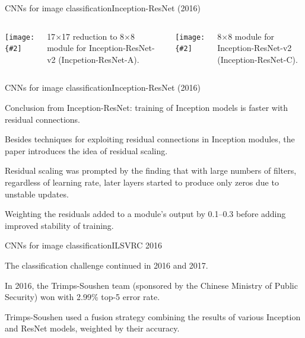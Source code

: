 \documentclass{beamer}
\newcommand{\myfig}[3]{\centerline{\texttt{[image: \{\#2]}}}
\begin{document}
\begin{frame}{CNNs for image classification}{Inception-ResNet (2016)}

  \begin{columns}

    \column{2in}
    
    \myfig{2in}{szegedy-16-fig18}{Szegedy et at.\ (2017), Fig.\ 18}

    \medskip

    17$\times$17 reduction to 8$\times$8 module for
    Inception-ResNet-v2 (Incpetion-ResNet-A).

    \column{2in}
    
    \myfig{1.6in}{szegedy-16-fig19}{Szegedy et at.\ (2017), Fig.\ 19}

    \medskip
    
    8$\times$8 module for Inception-ResNet-v2 (Inception-ResNet-C).
    
  \end{columns}
  
\end{frame}


\begin{frame}{CNNs for image classification}{Inception-ResNet (2016)}

  Conclusion from Inception-ResNet: training of Inception models is
  faster with residual connections.

  \medskip

  Besides techniques for exploiting residual connections in Inception
  modules, the paper introduces the idea of \alert{residual scaling}.

  \medskip

  Residual scaling was prompted by the finding that with large numbers
  of filters, regardless of learning rate, later layers started to
  produce only zeros due to unstable updates.

  \medskip

  Weighting the residuals added to a module's output by 0.1--0.3
  before adding improved stability of training.
  
\end{frame}


\begin{frame}{CNNs for image classification}{ILSVRC 2016}

  The classification challenge continued in 2016 and 2017.

  \medskip

  In 2016, the Trimps-Soushen team (sponsored by the Chinese Ministry
  of Public Security) won with 2.99\% top-5 error rate.

  \medskip

  Trimps-Soushen used a fusion strategy combining the results
  of various Inception and ResNet models, weighted by their accuracy.

\end{frame}
\end{document}
